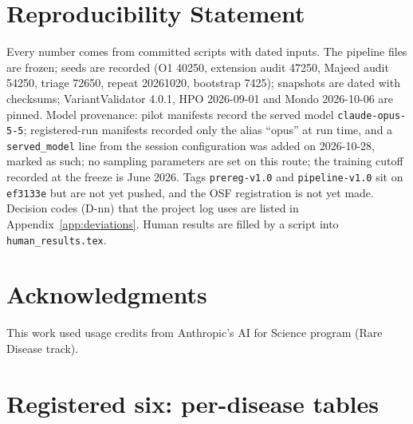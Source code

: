\documentclass{article} %
\begin{document}
\section*{Reproducibility Statement}
Every number comes from committed scripts with dated inputs. The pipeline files are frozen; seeds are recorded (O1 40250, extension audit 47250, Majeed audit 54250, triage 72650, repeat 20261020, bootstrap 7425); snapshots are dated with checksums; VariantValidator 4.0.1, HPO 2026-09-01 and Mondo 2026-10-06 are pinned. Model provenance: pilot manifests record the served model \texttt{claude-opus-5-5}; registered-run manifests recorded only the alias ``opus'' at run time, and a \texttt{served\_model} line from the session configuration was added on 2026-10-28, marked as such; no sampling parameters are set on this route; the training cutoff recorded at the freeze is June 2026. Tags \texttt{prereg-v1.0} and \texttt{pipeline-v1.0} sit on \texttt{ef3133e} but are not yet pushed, and the OSF registration is not yet made. Decision codes (D-nn) that the project log uses are listed in Appendix~\ref{app:deviations}. Human results are filled by a script into \texttt{human\_results.tex}.

\section*{Acknowledgments}
This work used usage credits from Anthropic's AI for Science program (Rare Disease track).




\clearpage
\appendix

\section{Registered six: per-disease tables}
\label{app:registered}
\end{document}
